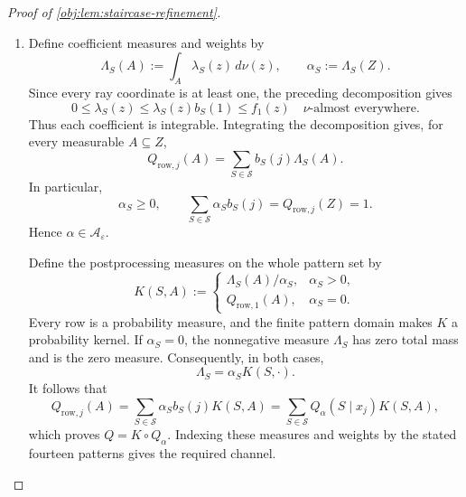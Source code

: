 \documentclass[11pt]{article}
\begin{document}
\begin{proof}[Proof of \cref{obj:lem:staircase-refinement}]
\begin{enumerate}
For every subset \(T\subseteq\mathcal X\), including the empty and full subsets, define
\[
\omega_T(z):=
\prod_{j:\,x_j\in T}y_j(z)
\prod_{j:\,x_j\notin T}(1-y_j(z)).
\]
Expanding the products yields
\[
\sum_{T\subseteq\mathcal X}\omega_T(z)=1,
\qquad
\sum_{\substack{T\subseteq\mathcal X\\x_j\in T}}\omega_T(z)=y_j(z),
\]
and consequently
\[
\sum_{T\subseteq\mathcal X}\omega_T(z)b_T(j)
=1+(r-1)y_j(z).
\]
To express this sum using proper nonempty subsets, put
\[
S_\dagger:=\{x_1\},
\qquad
k_{\mathrm{cube}}(z):=
\frac{\omega_\varnothing(z)+r\omega_{\mathcal X}(z)}{r+1},
\]
and, for \(S\in\mathcal S\), define
\[
\lambda_S(z):=
\max\left\{
0,\,
m_{\mathrm{base}}(z)
\left[
\omega_S(z)+k_{\mathrm{cube}}(z)
\bigl(\mathbf1_{\{S=S_\dagger\}}
+\mathbf1_{\{S=\mathcal X\setminus S_\dagger\}}\bigr)
\right]
\right\}.
\]
These functions are measurable and nonnegative on all of \(Z\). On the common set where the privacy inequalities hold, their expressions inside the maximum are nonnegative. Moreover,
\[
b_{S_\dagger}(j)+b_{\mathcal X\setminus S_\dagger}(j)=r+1,
\]
so the added complementary-pair contribution is precisely
\(\omega_\varnothing+r\omega_{\mathcal X}\), the contribution of the empty and full subsets. Therefore
\[
f_j(z)=\sum_{S\in\mathcal S}\lambda_S(z)b_S(j)
\quad\text{for \(\nu\)-almost every \(z\), for every \(j\)}.
\]
The case \(m_{\mathrm{base}}=0\) gives zero on both sides.

\item
Define coefficient measures and weights by
\[
\Lambda_S(A):=\int_A\lambda_S(z)\,d\nu(z),
\qquad
\alpha_S:=\Lambda_S(Z).
\]
Since every ray coordinate is at least one, the preceding decomposition gives
\[
0\le\lambda_S(z)
\le\lambda_S(z)b_S(1)
\le f_1(z)
\quad\text{\(\nu\)-almost everywhere}.
\]
Thus each coefficient is integrable. Integrating the decomposition gives, for every measurable \(A\subseteq Z\),
\[
Q_{\mathrm{row},j}(A)=\sum_{S\in\mathcal S}b_S(j)\Lambda_S(A).
\]
In particular,
\[
\alpha_S\ge0,
\qquad
\sum_{S\in\mathcal S}\alpha_S b_S(j)=Q_{\mathrm{row},j}(Z)=1.
\]
Hence \(\alpha\in\mathcal A_\varepsilon\).

Define the postprocessing measures on the whole pattern set by
\[
K(S,A):=
\begin{cases}
\Lambda_S(A)/\alpha_S,&\alpha_S>0,\\
Q_{\mathrm{row},1}(A),&\alpha_S=0.
\end{cases}
\]
Every row is a probability measure, and the finite pattern domain makes \(K\) a probability kernel. If \(\alpha_S=0\), the nonnegative measure \(\Lambda_S\) has zero total mass and is the zero measure. Consequently, in both cases,
\[
\Lambda_S=\alpha_S K(S,\cdot).
\]
It follows that
\[
Q_{\mathrm{row},j}(A)
=\sum_{S\in\mathcal S}\alpha_S b_S(j)K(S,A)
=\sum_{S\in\mathcal S}Q_\alpha(S\mid x_j)K(S,A),
\]
which proves \(Q=K\circ Q_\alpha\). Indexing these measures and weights by the stated fourteen patterns gives the required channel.


\end{enumerate}
\end{proof}
\end{document}
